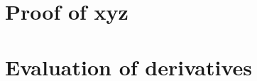 \chapter{Proof of xyz}%
\label{app:proof}

\chapter{Evaluation of derivatives}
\label{app:derivative}

